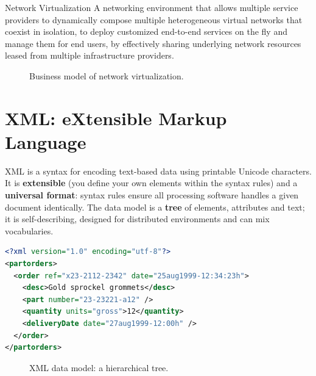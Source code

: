 \begin{defbox}{Network Virtualization}
A networking environment that allows multiple service providers to dynamically compose multiple heterogeneous
virtual networks that coexist in isolation, to deploy customized end-to-end services on the fly and manage them
for end users, by effectively sharing underlying network resources leased from multiple infrastructure providers.
\end{defbox}

\begin{figure}[H]
\centering
{}
\caption{Business model of network virtualization.}
\end{figure}

\section{XML: eXtensible Markup Language}
XML is a syntax for encoding text-based data using printable Unicode characters. It is \textbf{extensible} (you define
your own elements within the syntax rules) and a \textbf{universal format}: syntax rules ensure all processing
software handles a given document identically. The data model is a \textbf{tree} of elements, attributes and text; it is
self-describing, designed for distributed environments and can mix vocabularies.

\begin{lstlisting}[language=XML]
<?xml version="1.0" encoding="utf-8"?>
<partorders>
  <order ref="x23-2112-2342" date="25aug1999-12:34:23h">
    <desc>Gold sprockel grommets</desc>
    <part number="23-23221-a12" />
    <quantity units="gross">12</quantity>
    <deliveryDate date="27aug1999-12:00h" />
  </order>
</partorders>
\end{lstlisting}

\begin{figure}[H]
\centering
{}
\caption{XML data model: a hierarchical tree.}
\end{figure}

